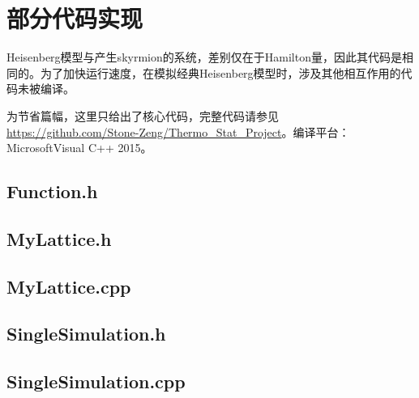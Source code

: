 \documentclass{article}
\begin{document}
	\section{部分代码实现}
		Heisenberg模型与产生skyrmion的系统，差别仅在于Hamilton量，因此其代码是相同的。为了加快运行速度，在模拟经典Heisenberg模型时，涉及其他相互作用的代码未被编译。
		
		为节省篇幅，这里只给出了核心代码，完整代码请参见 \url{https://github.com/Stone-Zeng/Thermo_Stat_Project}。编译平台：Microsoft\textregistered\;Visual C++ 2015。
		{
		\linespread{1}
%		
		\subsection{Function.h}
		
		\subsection{MyLattice.h}
		
		\subsection{MyLattice.cpp}
		
%		
%		
		\subsection{SingleSimulation.h}
		
		\subsection{SingleSimulation.cpp}
		
%		
%		
		}
		
\end{document}
